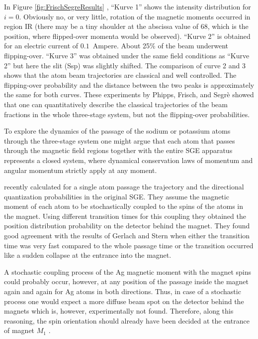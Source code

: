 \documentclass[12pt]{article}
\begin{document}
In Figure \ref{fig:FrischSegreResults} , ``Kurve 1'' shows the intensity distribution for $i=0$. Obviously no, or very little, rotation of the magnetic moments occurred in region IR (there may be a tiny shoulder at the abscissa value of $68$, which is the position, where flipped-over momenta would be observed). ``Kurve 2'' is obtained for an electric current of $0.1$~Ampere. About 25\% of the beam underwent flipping-over. ``Kurve 3'' was obtained under the same field conditions as ``Kurve 2'' but here the slit (Ssp) was slightly shifted. The comparison of curve 2 and 3 shows that the atom beam trajectories are classical and well controlled. The flipping-over probability and the distance between the two peaks is approximately the same for both curves. These experiments by Phipps, Frisch, and Segrè showed that one can quantitatively describe the classical trajectories of the beam fractions in the whole three-stage system, but not the flipping-over probabilities. 

To explore the dynamics of the passage of the sodium or potassium atoms through the three-stage system one might argue that each atom that passes through the magnetic field regions together with the entire SGE apparatus represents a closed system, where dynamical conservation laws of momentum and angular momentum strictly apply at any moment. 

\cite{WennerstroemHEtal2012experiment,WennerstroemHEtal2013measurements,WennerstroemHEtal2014Interpretation} recently calculated for a single atom passage the trajectory and the directional quantization probabilities in the original SGE. 
They assume the magnetic moment of each atom to be stochastically coupled to the spins of the atoms in the magnet. Using different transition times for this coupling they obtained the position distribution probability on the detector behind the magnet. They found good agreement with the results of Gerlach and Stern when either the transition time was very fast compared to the whole passage time or the transition occurred like a sudden collapse at the entrance into the magnet.  

A stochastic coupling process of the Ag magnetic moment with the magnet spins could probably occur, however, at any position of the passage inside the magnet again and again for Ag atoms in both directions. Thus, in case of a stochastic process one would expect a more diffuse beam spot on the detector behind the magnets which is, however, experimentally not found. Therefore, along this reasoning, the spin orientation should already have been decided at the entrance of magnet $M_1$ .
\end{document}
